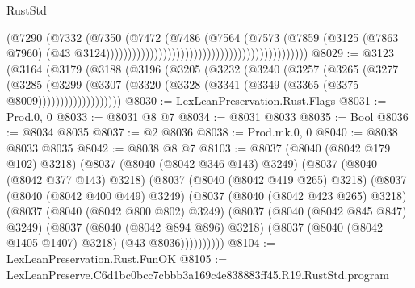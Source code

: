 \begin{lexlean}{RustStd}
\begin{coremodule}
                                                                            (@7290
                                                                              (@7332
                                                                                (@7350
                                                                                  (@7472
                                                                                    (@7486
                                                                                      (@7564
                                                                                        (@7573
                                                                                          (@7859
                                                                                            (@3125
                                                                                              (@7863
                                                                                                @7960)
                                                                                              (@43
                                                                                                @3124))))))))))))))))))))))))))))))))))))))))))))))
@8029 := @3123
    (@3164
      (@3179
        (@3188
          (@3196
            (@3205
              (@3232
                (@3240
                  (@3257
                    (@3265
                      (@3277
                        (@3285
                          (@3299
                            (@3307
                              (@3320 (@3328 (@3341 (@3349 (@3365 (@3375 @8009)))))))))))))))))))
@8030 := LexLeanPreservation.Rust.Flags
@8031 := Prod.{0, 0}
@8033 := @8031 @8 @7
@8034 := @8031 @8033
@8035 := Bool
@8036 := @8034 @8035
@8037 := @2 @8036
@8038 := Prod.mk.{0, 0}
@8040 := @8038 @8033 @8035
@8042 := @8038 @8 @7
@8103 := @8037
    (@8040 (@8042 @179 @102) @3218)
    (@8037
      (@8040 (@8042 @346 @143) @3249)
      (@8037
        (@8040 (@8042 @377 @143) @3218)
        (@8037
          (@8040 (@8042 @419 @265) @3218)
          (@8037
            (@8040 (@8042 @400 @449) @3249)
            (@8037
              (@8040 (@8042 @423 @265) @3218)
              (@8037
                (@8040 (@8042 @800 @802) @3249)
                (@8037
                  (@8040 (@8042 @845 @847) @3249)
                  (@8037
                    (@8040 (@8042 @894 @896) @3218)
                    (@8037 (@8040 (@8042 @1405 @1407) @3218) (@43 @8036))))))))))
@8104 := LexLeanPreservation.Rust.FunOK
@8105 := LexLeanPreserve.C6d1bc0bcc7cbbb3a169c4e838883ff45.R19.RustStd.program

\end{coremodule}
\end{lexlean}
